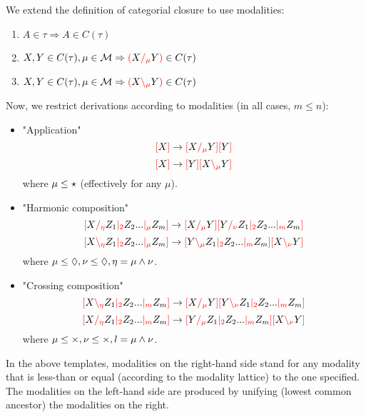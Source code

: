 \documentclass[main.tex]{subfiles}
\begin{document}
\begin{defn}
    We extend the definition of categorial closure to use modalities:
    \begin{enumerate}
        \item \label{cmod:atomic} $A \in \tau \Rightarrow A \in C(\tau)$
        \item \label{cmod:right}  $X, Y \in C(\tau), \mu \in \mathcal{M} \Rightarrow \lp X \rci{\mu} Y \rp \in C(\tau)$
        \item \label{cmod:left}   $X, Y \in C(\tau), \mu \in \mathcal{M} \Rightarrow \lp X \lci{\mu} Y \rp \in C(\tau)$
    \end{enumerate}
\end{defn}

Now, we restrict derivations according to modalities (in all cases, $m \leq n$):
\begin{itemize}
    \item "Application"
        \[ \lb X \rb \rightarrow \lb X \rci{\mu} Y \rb \lb Y \rb \]
        \[ \lb X \rb \rightarrow \lb Y \rb \lb X \lci{\mu} Y \rb \]
        where $\mu \less \modstar$ (effectively for any $\mu$).
    \item "Harmonic composition"
        \[ \lb X \rci{\eta} Z_1 \mci{2} Z_2 ... \mci{\mu} Z_m \rb \rightarrow \lb X \rci{\mu} Y \rb \lb Y \rci{\nu} Z_1 \mci{2} Z_2 ... \mci{m} Z_m \rb \]
        \[ \lb X \lci{\eta} Z_1 \mci{2} Z_2 ... \mci{\mu} Z_m \rb \rightarrow \lb Y \lci{\mu} Z_1 \mci{2} Z_2 ... \mci{m} Z_m \rb \lb X \lci{\nu} Y \rb \]
        where $\mu \less \modr, \nu \less \modr, \eta = \mu \meet \nu$.
    \item "Crossing composition"
        \[ \lb X \lci{\eta} Z_1 \mci{2} Z_2 ... \mci{m} Z_m \rb \rightarrow \lb X \rci{\mu} Y \rb \lb Y \lci{\nu} Z_1 \mci{2} Z_2 ... \mci{m} Z_m \rb \]
        \[ \lb X \rci{\eta} Z_1 \mci{2} Z_2 ... \mci{m} Z_m \rb \rightarrow \lb Y \rci{\mu} Z_1 \mci{2} Z_2 ... \mci{m} Z_m \rb \lb X \lci{\nu} Y \rb \]
        where $\mu \less \modx, \nu \less \modx, l = \mu \meet \nu$.
\end{itemize}

In the above templates, modalities on the right-hand side stand for any
modality that is less-than or equal (according to the modality lattice)
to the one specified. The modalities on the left-hand side are produced by
unifying (lowest common ancestor) the modalities on the right.

\end{document}
